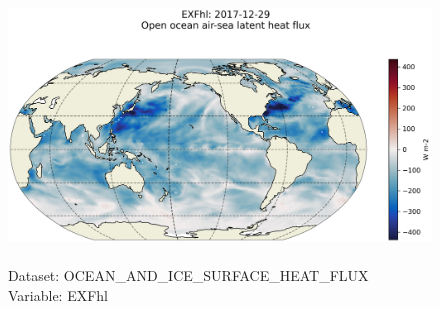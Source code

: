 \begin{figure}[H]
\centering
\includegraphics[scale=0.5]{../images/plots/latlon_plots/Ocean_and_Sea-Ice_Surface_Heat_Fluxes/EXFhl.png}
\caption{\\Dataset: OCEAN\_AND\_ICE\_SURFACE\_HEAT\_FLUX\\Variable: EXFhl}
\label{tab:table-OCEAN_AND_ICE_SURFACE_HEAT_FLUX_EXFhl-Plot}
\end{figure}
\pagebreak
